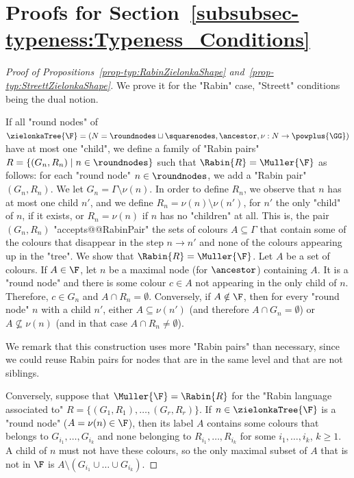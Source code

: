 \documentclass{theoretics}
\begin{document}
	\section{Proofs for Section~\ref{subsubsec-typeness:Typeness_Conditions}}
	\label{sec:appendix-typeness-proofs-Muller-conditions}
	\begin{proof}[Proof of Propositions~\ref{prop-typ:RabinZielonkaShape} and~\ref{prop-typ:StreettZielonkaShape}]
		We prove it for the "Rabin" case, "Streett" conditions being the dual notion.
			
		If all "round nodes" of $\zielonkaTree{\F} = (N =\roundnodes\sqcup \squarenodes, \ancestor, \nu :N \to \powplus{\GG})$ have at most one "child", we define a family of "Rabin pairs" $R = \{(G_n,R_n)\mid n\in \roundnodes\}$ such that $\Rabin{R}= \Muller{\F}$ as follows: for each "round node" $n\in \roundnodes$, we add a "Rabin pair" $(G_n,R_n)$. We let $G_n= \Gamma \setminus \nu(n)$. In order to define $R_n$, we observe that $n$ has at most one child $n'$, and we define $R_n=\nu(n)\setminus \nu(n')$, for $n'$ the only "child" of $n$, if it exists, or $R_n=\nu(n)$ if $n$ has no "children" at all. This is, the pair $(G_n,R_n)$ "accepts@@RabinPair" the sets of colours $A\subseteq \Gamma$ that contain some of the colours that disappear in the step $n\rightarrow n'$ and none of the colours appearing up in the "tree". We show that $\Rabin{R}= \Muller{\F}$. Let $A$ be a set of colours. If $A\in \F$, let $n$ be a maximal node (for $\ancestor$) containing $A$. It is a "round node" and there is some colour $c\in A$ not appearing in the only child of $n$. Therefore, $c\in G_n$ and $A \cap R_n=\emptyset$. Conversely, if $A\notin \F$, then for every "round node" $n$ with a child $n'$, either $A\subseteq \nu(n')$ (and therefore $A\cap G_n = \emptyset$) or $A \nsubseteq \nu(n)$ (and in that case $A\cap R_n \neq \emptyset$).
			
		We remark that this construction uses more "Rabin pairs" than necessary, since we could reuse Rabin pairs for nodes that are in the same level and that are not siblings.
			
		Conversely, suppose that $\Muller{\F} = \Rabin{R}$ for the "Rabin language associated to" $R=\{(G_1,R_1),\dots,(G_r,R_r)\}$. If $n \in \zielonkaTree{\F}$ is a "round node" ($A=\nu(n)\in \F$), then its label $A$ contains some colours that belongs to $G_{i_1},\dots,G_{i_k}$ and none belonging to $R_{i_1},\dots,R_{i_k}$ for some $i_1,\dots, i_k$, $k\geq 1$. A child of $n$ must not have these colours, so the only maximal subset of $A$ that is not in $\F$ is $A\setminus (G_{i_1}\cup \dots \cup G_{i_k})$.				
\end{proof}
	
\end{document}
